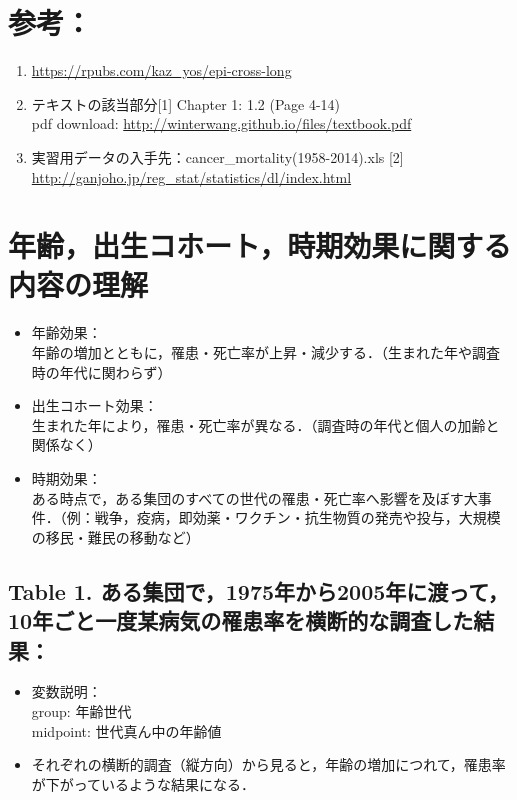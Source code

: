 \documentclass[11pt,]{article}
\providecommand{\tightlist}{%
  \setlength{\itemsep}{0pt}\setlength{\parskip}{0pt}}
\begin{document}
\section{参考：}

\begin{enumerate}
\def\labelenumi{\arabic{enumi}.}
\item
  \url{https://rpubs.com/kaz_yos/epi-cross-long}
\item
  テキストの該当部分{[}1{]} Chapter 1: 1.2 (Page 4-14)\\
  pdf download: \url{http://winterwang.github.io/files/textbook.pdf}
\item
  実習用データの入手先：cancer\_mortality(1958-2014).xls {[}2{]}
  \url{http://ganjoho.jp/reg_stat/statistics/dl/index.html}
\end{enumerate}

\section{年齢，出生コホート，時期効果に関する内容の理解}

\begin{itemize}
\tightlist
\item
  年齢効果：\\
  年齢の増加とともに，罹患・死亡率が上昇・減少する．（生まれた年や調査時の年代に関わらず）
\item
  出生コホート効果：\\
  生まれた年により，罹患・死亡率が異なる．（調査時の年代と個人の加齢と関係なく）
\item
  時期効果：\\
  ある時点で，ある集団のすべての世代の罹患・死亡率へ影響を及ぼす大事件．（例：戦争，疫病，即効薬・ワクチン・抗生物質の発売や投与，大規模の移民・難民の移動など）
\end{itemize}

\subsection{Table 1.
ある集団で，1975年から2005年に渡って，10年ごと一度某病気の罹患率を横断的な調査した結果：}\label{table-1.-1975200510}

\begin{itemize}
\tightlist
\item
  変数説明：\\
  group: 年齢世代\\
  midpoint: 世代真ん中の年齢値\\
\item
  それぞれの横断的調査（縦方向）から見ると，年齢の増加につれて，罹患率が下がっているような結果になる．
\end{itemize}
\end{document}
